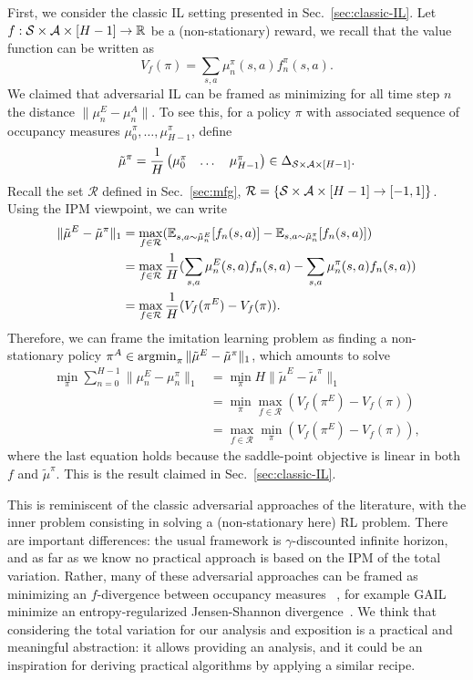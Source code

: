 \documentclass{article}
\begin{document}
First, we consider the classic IL setting presented in Sec.~\ref{sec:classic-IL}. Let $f:\mathcal{S}\times\mathcal{A}\times[H-1] \rightarrow \mathbb{R}$ be a (non-stationary) reward, we recall that the value function can be written as
\begin{equation}
    V_f(\pi) = \sum_{s,a} \mu_n^\pi(s,a) f_n^\pi(s,a).
\end{equation}
We claimed that adversarial IL can be framed as minimizing for all time step $n$ the distance $\|\mu_n^E - \mu_n^A\|$. To see this, for a policy $\pi$ with associated sequence of occupancy measures $\mu_0^\pi,\dots,\mu_{H-1}^\pi$, define
\begin{equation}
    \tilde{\mu}^\pi = \frac{1}{H} \begin{pmatrix} \mu_0^\pi & \dots & \mu_{H-1}^\pi \end{pmatrix} \in \Delta_{\mathcal{S}\times\mathcal{A}\times[H-1]}.
\end{equation}
Recall the set $\mathcal{R}$ defined in Sec.~\ref{sec:mfg}, $\mathcal{R} = \{\mathcal{S}\times\mathcal{A}\times[H-1] \rightarrow [-1,1]\}$. Using the IPM viewpoint, we can write
\begin{align}
    \|\tilde{\mu}^E - \tilde{\mu}^\pi\|_1 &= \max_{f\in \mathcal{R}} (\mathbb{E}_{s,a\sim\tilde{\mu}_n^E}[f_n(s,a)]-\mathbb{E}_{s,a\sim\tilde{\mu}_n^\pi}[f_n(s,a)])
    \\
    &= \max_{f\in \mathcal{R}} \frac{1}{H} (\sum_{s,a} \mu_n^E(s,a) f_n(s,a) - \sum_{s,a} \mu_n^\pi(s,a) f_n(s,a))
    \\
    &= \max_{f\in \mathcal{R}} \frac{1}{H} (V_f(\pi^E) - V_f(\pi)).
\end{align}
Therefore, we can frame the imitation learning problem as finding a non-stationary policy $\pi^A\in\operatorname*{argmin}_\pi \|\tilde{\mu}^E - \tilde{\mu}^\pi\|_1$, which amounts to solve
\begin{align}
    \min_\pi \sum_{n=0}^{H-1}\|\mu_n^E - \mu_n^\pi\|_1 &= \min_\pi H \|\tilde{\mu}^E - \tilde{\mu}^\pi\|_1 
    \\
    &= \min_\pi \max_{f\in\mathcal{R}} (V_f(\pi^E) - V_f(\pi))
    \\
    &= \max_{f\in\mathcal{R}} \min_\pi (V_f(\pi^E) - V_f(\pi)),
\end{align}
where the last equation holds because the saddle-point objective is linear in both $f$ and $\tilde{\mu}^\pi$. This is the result claimed in Sec.~\ref{sec:classic-IL}.

This is reminiscent of the classic adversarial approaches of the literature, with the inner problem consisting in solving a (non-stationary here) RL problem. There are important differences: the usual framework is $\gamma$-discounted infinite horizon, and as far as we know no practical approach is based on the IPM of the total variation. Rather, many of these adversarial approaches can be framed as minimizing an $f$-divergence between occupancy measures
~\cite{ghasemipour2020divergence,ke2021imitation}, for example GAIL minimize an entropy-regularized Jensen-Shannon divergence~\cite{ho2016generative}. We think that considering the total variation for our analysis and exposition is a practical and meaningful abstraction: it allows providing an analysis, and it could be an inspiration for deriving practical algorithms by applying a similar recipe.
\end{document}
